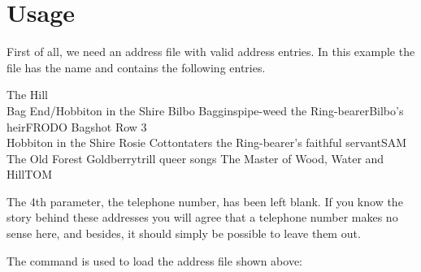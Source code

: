 \section{Usage}

First of all, we need an address file with valid address entries.  In
this example the file has the name  and contains the
following entries.
\begin{lstcode}
            {The Hill\\ Bag End/Hobbiton in the Shire}{}%
            {Bilbo Baggins}{pipe-weed}%
            {the Ring-bearer}{Bilbo's heir}{FRODO}
            {Bagshot Row 3\\Hobbiton in the Shire}{}%
            {Rosie Cotton}{taters}%
            {the Ring-bearer's faithful servant}{SAM}
            {The Old Forest}{}%
            {Goldberry}{trill queer songs}%
            {The Master of Wood, Water and Hill}{TOM}
\end{lstcode}

The 4th parameter, the telephone number, has been
left blank. If you know the story behind these addresses you will
agree that a telephone number makes no sense here, and besides, it
should simply be possible to leave them out. 

The command
 is used to load the address file shown above:
\begin{lstcode}[belowskip=\dp\strutbox]
\end{lstcode}


